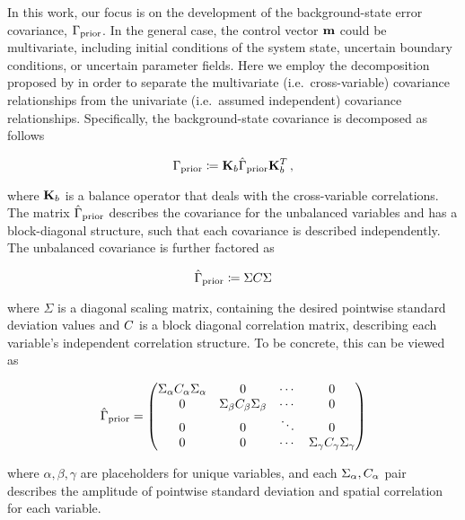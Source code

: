 In this work, our focus is on the development of the background-state error
covariance, $\Gamma_{\text{prior}}$.
In the general case, the control vector $\mathbf{m}$ could be multivariate,
including initial conditions of the system state, uncertain boundary
conditions, or uncertain parameter fields.
Here we employ the decomposition proposed by
\citet{derber_reformulation_1999}
in order to separate the multivariate (i.e.\ cross-variable)
covariance relationships from the univariate (i.e.\ assumed
independent) covariance relationships.
Specifically, the background-state covariance is decomposed as follows
\begin{linenomath*}\begin{equation*}
    \Gamma_{\text{prior}} \coloneqq \mathbf{K}_{b}\hat{\Gamma}_\text{prior}\mathbf{K}_{b}^T \,
    ,
\end{equation*}\end{linenomath*}
where $\mathbf{K}_{b}$ is a balance operator that deals with the
cross-variable correlations.
The matrix $\hat{\Gamma}_\text{prior}$ describes the covariance for the unbalanced
variables and has a block-diagonal structure, such that each
covariance is described independently.
The unbalanced covariance is further factored as
\begin{linenomath*}\begin{equation*}
    \hat{\Gamma}_\text{prior} \coloneqq \Sigma C \Sigma
\end{equation*}\end{linenomath*}
where $\Sigma$ is a diagonal scaling matrix, containing the desired pointwise
standard deviation values and $C$ is a block diagonal correlation matrix,
describing each variable's independent correlation structure.
To be concrete, this can be viewed as
\begin{linenomath*}\begin{equation*}
    \hat{\Gamma}_\text{prior} =
    \begin{pmatrix}
        \Sigma_\alpha C_\alpha\Sigma_\alpha & 0 & \cdots & 0 \\
        0 & \Sigma_\beta C_\beta\Sigma_\beta & \cdots & 0 \\
        0 & 0 & \ddots & 0  \\
        0 & 0 & \cdots & \Sigma_\gamma C_\gamma\Sigma_\gamma \\
    \end{pmatrix}
\end{equation*}\end{linenomath*}
where $\alpha, \beta, \gamma$ are placeholders for unique variables, and each
$\Sigma_\alpha, C_\alpha$ pair describes the amplitude of pointwise standard deviation
and spatial correlation for each variable.



